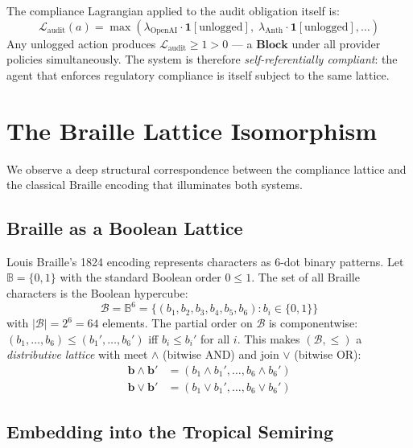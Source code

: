 \documentclass[11pt,twocolumn]{article}
\begin{document}
The compliance Lagrangian applied to the audit obligation itself is:
\begin{equation}
  \mathcal{L}_{\text{audit}}(a) = \max\!\left(\lambda_{\text{OpenAI}} \cdot \mathbf{1}[\text{unlogged}],\;
    \lambda_{\text{Anth}} \cdot \mathbf{1}[\text{unlogged}], \ldots \right)
\end{equation}
Any unlogged action produces $\mathcal{L}_{\text{audit}} \geq 1 > 0$ — a
$\mathbf{Block}$ under all provider policies simultaneously. The system is
therefore \emph{self-referentially compliant}: the agent that enforces
regulatory compliance is itself subject to the same lattice.

\section{The Braille Lattice Isomorphism}
\label{sec:braille}

We observe a deep structural correspondence between the compliance lattice and
the classical Braille encoding that illuminates both systems.

\subsection{Braille as a Boolean Lattice}

Louis Braille's 1824 encoding represents characters as $6$-dot binary patterns.
Let $\mathbb{B} = \{0,1\}$ with the standard Boolean order $0 \leq 1$. The set
of all Braille characters is the Boolean hypercube:
\begin{equation}
  \mathcal{B} = \mathbb{B}^6 = \{(b_1, b_2, b_3, b_4, b_5, b_6) : b_i \in \{0,1\}\}
\end{equation}
with $|\mathcal{B}| = 2^6 = 64$ elements. The partial order on $\mathcal{B}$ is
componentwise: $(b_1,\ldots,b_6) \leq (b_1',\ldots,b_6')$ iff $b_i \leq b_i'$
for all $i$. This makes $(\mathcal{B}, \leq)$ a \emph{distributive lattice}
with meet $\wedge$ (bitwise AND) and join $\vee$ (bitwise OR):
\begin{align}
  \mathbf{b} \wedge \mathbf{b}' &= (b_1 \wedge b_1', \ldots, b_6 \wedge b_6') \\
  \mathbf{b} \vee  \mathbf{b}' &= (b_1 \vee  b_1', \ldots, b_6 \vee  b_6')
\end{align}

\subsection{Embedding into the Tropical Semiring}
\end{document}
